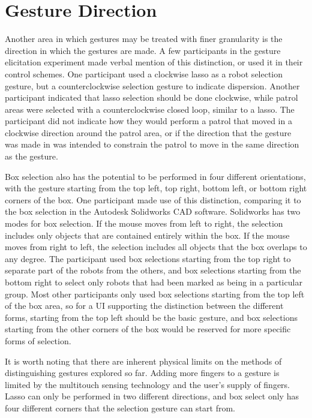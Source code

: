 \section{Gesture Direction}

Another area in which gestures may be treated with finer granularity is the direction in which the gestures are made. 
A few participants in the gesture elicitation experiment made verbal mention of this distinction, or used it in their control schemes. 
One participant used a clockwise lasso as a robot selection gesture, but a counterclockwise selection gesture to indicate dispersion. 
Another participant indicated that lasso selection should be done clockwise, while patrol areas were selected with a counterclockwise closed loop, similar to a lasso. 
The participant did not indicate how they would perform a patrol that moved in a clockwise direction around the patrol area, or if the direction that the gesture was made in was intended to constrain the patrol to move in the same direction as the gesture. 

Box selection also has the potential to be performed in four different orientations, with the gesture starting from the top left, top right, bottom left, or bottom right corners of the box. 
One participant made use of this distinction, comparing it to the box selection in the Autodesk Solidworks CAD software. 
Solidworks has two modes for box selection. 
If the mouse moves from left to right, the selection includes only objects that are contained entirely within the box. 
If the mouse moves from right to left, the selection includes all objects that the box overlaps to any degree. 
The participant used box selections starting from the top right to separate part of the robots from the others, and box selections starting from the bottom right to select only robots that had been marked as being in a particular group. 
Most other participants only used box selections starting from the top left of the box area, so for a UI supporting the distinction between the different forms, starting from the top left should be the basic gesture, and box selections starting from the other corners of the box would be reserved for more specific forms of selection. 

It is worth noting that there are inherent physical limits on the methods of distinguishing gestures explored so far. Adding more fingers to a gesture is limited by the multitouch sensing technology and the user's supply of fingers. 
Lasso can only be performed in two different directions, and box select only has four different corners that the selection gesture can start from. 

